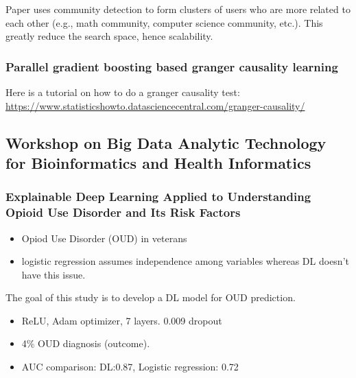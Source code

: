 Paper uses community detection to form clusters of users who are more related to each other (e.g., math community, computer science community, etc.). This greatly reduce the search space, hence scalability. 

\subsubsection{Parallel gradient boosting based granger causality learning}


Here is a tutorial on how to do a granger causality test: \url{https://www.statisticshowto.datasciencecentral.com/granger-causality/}\\


\spacerule

\subsection{Workshop on Big Data Analytic Technology for Bioinformatics and Health Informatics}

\subsubsection{Explainable Deep Learning Applied to Understanding Opioid Use Disorder and Its Risk Factors}

\begin{itemize}
    \item Opiod Use Disorder (OUD) in veterans 
    \item logistic regression assumes independence among variables whereas DL doesn't have this issue.
\end{itemize}{}


The goal of this study is to develop a DL model for OUD prediction.

\begin{itemize}
    \item ReLU, Adam optimizer, 7 layers. 0.009 dropout
    \item 4\% OUD diagnosis (outcome).
    \item AUC comparison: DL:0.87, Logistic regression: 0.72
\end{itemize}{}

